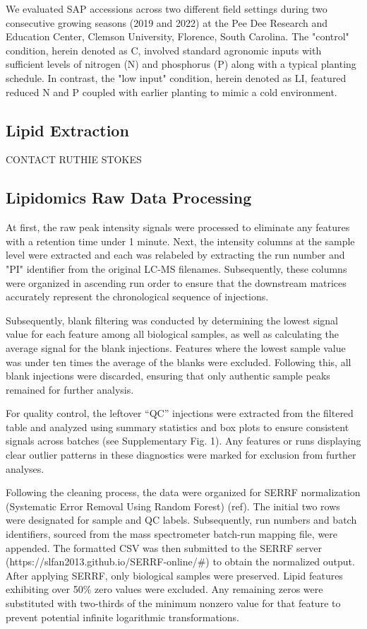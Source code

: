 \documentclass[10pt,letterpaper]{article}
\begin{document}
We evaluated SAP accessions across two different field settings during two consecutive growing seasons (2019 and 2022) at the Pee Dee Research and Education Center, Clemson University, Florence, South Carolina. The "control" condition, herein denoted as C, involved standard agronomic inputs with sufficient levels of nitrogen (N) and phosphorus (P) along with a typical planting schedule. In contrast, the "low input" condition, herein denoted as LI,  featured reduced N and P coupled with earlier planting to mimic a cold environment.

\subsection*{Lipid Extraction}
CONTACT RUTHIE STOKES



\subsection*{Lipidomics  Raw Data Processing}
At first, the raw peak intensity signals were processed to eliminate any features with a retention time under 1 minute. Next, the intensity columns at the sample level were extracted and each was relabeled by extracting the run number and "PI" identifier from the original LC-MS filenames. Subsequently, these columns were organized in ascending run order to ensure that the downstream matrices accurately represent the chronological sequence of injections.

Subsequently, blank filtering was conducted by determining the lowest signal value for each feature among all biological samples, as well as calculating the average signal for the blank injections. Features where the lowest sample value was under ten times the average of the blanks were excluded. Following this, all blank injections were discarded, ensuring that only authentic sample peaks remained for further analysis.

For quality control, the leftover “QC” injections were extracted from the filtered table and analyzed using summary statistics and box plots to ensure consistent signals across batches (see Supplementary Fig. 1). Any features or runs displaying clear outlier patterns in these diagnostics were marked for exclusion from further analyses.

Following the cleaning process, the data were organized for SERRF normalization (Systematic Error Removal Using Random Forest) (ref). The initial two rows were designated for sample and QC labels. Subsequently, run numbers and batch identifiers, sourced from the mass spectrometer batch-run mapping file, were appended. The formatted CSV was then submitted to the SERRF server (https://slfan2013.github.io/SERRF-online/\#) to obtain the normalized output. After applying SERRF, only biological samples were preserved. Lipid features exhibiting over 50\% zero values were excluded. Any remaining zeros were substituted with two-thirds of the minimum nonzero value for that feature to prevent potential infinite logarithmic transformations.
\end{document}
